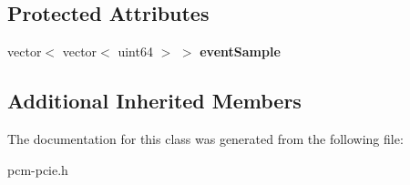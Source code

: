 \subsection*{Protected Attributes}
\begin{DoxyCompactItemize}
\item 
\mbox{\label{classLegacyPlatform_a6e50a92635370fa58ff28ab614b11cb2}} 
vector$<$ vector$<$ uint64 $>$ $>$ {\bfseries event\+Sample}
\end{DoxyCompactItemize}
\subsection*{Additional Inherited Members}


The documentation for this class was generated from the following file\+:\begin{DoxyCompactItemize}
\item 
pcm-\/pcie.\+h\end{DoxyCompactItemize}
